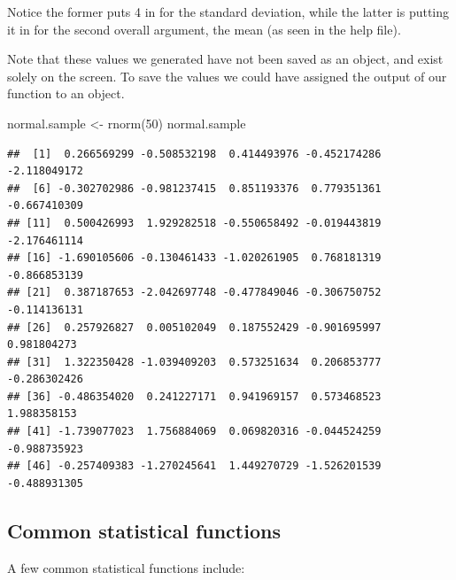\documentclass[
]{book}
\newenvironment{Shaded}{\begin{snugshade}}{\end{snugshade}}
\newcommand{\DecValTok}[1]{\textcolor[rgb]{0.00,0.00,0.81}{#1}}
\newcommand{\FunctionTok}[1]{\textcolor[rgb]{0.00,0.00,0.00}{#1}}
\newcommand{\NormalTok}[1]{#1}
\newcommand{\OtherTok}[1]{\textcolor[rgb]{0.56,0.35,0.01}{#1}}
\begin{document}
Notice the former puts 4 in for the standard deviation, while the latter is putting it in for the second overall argument, the mean (as seen in the help file).

Note that these values we generated have not been saved as an object, and exist solely on the screen. To save the values we could have assigned the output of our function to an object.

\begin{Shaded}
\begin{Highlighting}[]
\NormalTok{normal.sample }\OtherTok{\textless{}{-}} \FunctionTok{rnorm}\NormalTok{(}\DecValTok{50}\NormalTok{)}
\NormalTok{normal.sample}
\end{Highlighting}
\end{Shaded}

\begin{verbatim}
##  [1]  0.266569299 -0.508532198  0.414493976 -0.452174286 -2.118049172
##  [6] -0.302702986 -0.981237415  0.851193376  0.779351361 -0.667410309
## [11]  0.500426993  1.929282518 -0.550658492 -0.019443819 -2.176461114
## [16] -1.690105606 -0.130461433 -1.020261905  0.768181319 -0.866853139
## [21]  0.387187653 -2.042697748 -0.477849046 -0.306750752 -0.114136131
## [26]  0.257926827  0.005102049  0.187552429 -0.901695997  0.981804273
## [31]  1.322350428 -1.039409203  0.573251634  0.206853777 -0.286302426
## [36] -0.486354020  0.241227171  0.941969157  0.573468523  1.988358153
## [41] -1.739077023  1.756884069  0.069820316 -0.044524259 -0.988735923
## [46] -0.257409383 -1.270245641  1.449270729 -1.526201539 -0.488931305
\end{verbatim}

\hypertarget{common-statistical-functions}{%
\subsection*{Common statistical functions}\label{common-statistical-functions}}

A few common statistical functions include:
\end{document}

